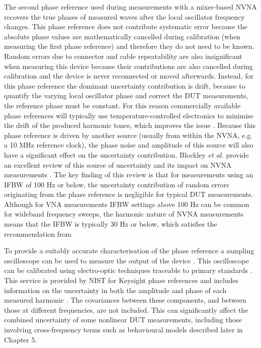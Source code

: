 \documentclass[../thesis/thesis.tex]{subfiles}
\begin{document}
The second phase reference used during measurements with a mixer-based NVNA recovers the true phases of measured waves after the local oscillator frequency changes. This phase reference does not contribute systematic error because the absolute phase values are mathematically cancelled during calibration (when measuring the first phase reference) and therefore they do not need to be known. Random errors due to connector and cable repeatability are also insignificant when measuring this device because their contributions are also cancelled during calibration and the device is never reconnected or moved afterwards. Instead, for this phase reference the dominant uncertainty contribution is drift, because to quantify the varying local oscillator phase and correct the DUT measurements, the reference phase must be constant. For this reason commercially available phase references will typically use temperature-controlled electronics to minimise the drift of the produced harmonic tones, which improves the issue \cite{Jargon_2003}. Because this phase reference is driven by another source (usually from within the NVNA, e.g. a 10 MHz reference clock), the phase noise and amplitude of this source will also have a significant effect on the uncertainty contribution. Blockley \emph{et al.} provide an excellent review of this source of uncertainty and its impact on NVNA measurements \cite{Blockley_2007}. The key finding of this review is that for measurements using an IFBW of 100 Hz or below, the uncertainty contribution of random errors originating from the phase reference is negligible for typical DUT measurements. Although for VNA measurements IFBW settings above 100 Hz can be common for wideband frequency sweeps, the harmonic nature of NVNA measurements means that the IFBW is typically 30 Hz or below, which satisfies the recommendation from \cite{Blockley_2007}

To provide a suitably accurate characterisation of the phase reference a sampling oscilloscope can be used to measure the output of the device \cite{Reader_2008}. This oscilloscope can be calibrated using electro-optic techniques traceable to primary standards \cite{Williams_2006, Hale_2009}. This service is provided by NIST for Keysight phase references and includes information on the uncertainty in both the amplitude and phase of each measured harmonic \cite{Keysight_2017}. The covariances between these components, and between those at different frequencies, are not included. This can significantly affect the combined uncertainty of some nonlinear DUT measurements, including those involving cross-frequency terms such as behavioural models described later in Chapter 5.
\end{document}
